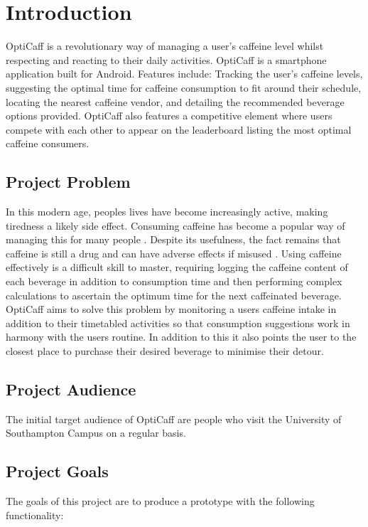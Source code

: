 \section{Introduction}
OptiCaff is a revolutionary way of managing a user's caffeine level whilst respecting and reacting to their daily activities.
OptiCaff is a smartphone application built for Android. 
Features include:
Tracking the user's caffeine levels,
suggesting the optimal time for caffeine consumption to fit around their schedule,
locating the nearest caffeine vendor,
and detailing the recommended beverage options provided.
OptiCaff also features a competitive element where users compete with each other to appear on the leaderboard listing the most optimal caffeine consumers. 

\subsection{Project Problem}
In this modern age, peoples lives have become increasingly active, making tiredness a likely side effect. 
Consuming caffeine has become a popular way of managing this for many people \cite{Popularity}.
Despite its usefulness, the fact remains that caffeine is still a drug and can have adverse effects if misused \cite{misuse}.
Using caffeine effectively is a difficult skill to master, requiring logging the caffeine content of each beverage in addition to consumption time and then performing complex calculations to ascertain the optimum time for the next caffeinated beverage.
OptiCaff aims to solve this problem by monitoring a users caffeine intake in addition to their timetabled activities so that consumption suggestions work in harmony with the users routine.
In addition to this it also points the user to the closest place to purchase their desired beverage to minimise their detour.  
  
\subsection{Project Audience}
The initial target audience of OptiCaff are people who visit the University of Southampton Campus on a regular basis. 

\subsection{Project Goals}
The goals of this project are to produce a prototype with the following functionality: 

